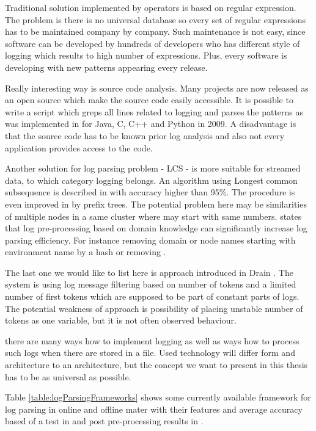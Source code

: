 Traditional solution implemented by operators is based on regular expression. The problem is there is no universal database so every set of regular expressions has to be maintained company by company. Such maintenance is not easy, since software can be developed by hundreds of developers who has different style of logging which results to high number of expressions. Plus, every software is developing with new patterns appearing every release.

Really interesting way is source code analysis. Many projects are now released as an open source which make the source code easily accessible. It is possible to write a script which greps all lines related to logging and parses the patterns as was implemented in \cite{xu2009detecting} for Java, C, C++ and Python in 2009. A disadvantage is that the source code has to be known prior log analysis and also not every application provides access to the code. 

Another solution for log parsing problem - LCS - is more suitable for streamed data, to which category logging belongs. An algorithm using Longest common subsequence is described in \cite{fu2009execution} with accuracy higher than 95\%. The procedure is even improved in \cite{du2016spell} by prefix trees. The potential problem here may be similarities of multiple nodes in a same cluster where  may start with same numbers. \cite{he2016evaluation} states that log pre-processing based on domain knowledge can significantly increase log parsing efficiency. For instance removing domain or node names starting with environment name by a hash or removing .

The last one\ms{,} we would like to list here\ms{,} is  approach introduced in Drain \cite{he2017drain}. The system is using log message filtering based on number of tokens and a limited number of first tokens which are supposed to be part of constant parts of logs. The potential weakness of  approach is possibility of placing unstable number of tokens as one variable, but it is not often observed behaviour. 

 there are many ways how to implement logging as well as ways how to process such logs when there are stored in a file. Used technology will differ form and architecture to an architecture, but the concept we want to present in this thesis has to be as universal as possible.

Table \ref{table:logParsingFrameworks} shows some currently available framework for log parsing in online and offline mater with their features and average accuracy based of a test in \cite{he2017drain} and post pre-processing results in \cite{he2016evaluation}. 

